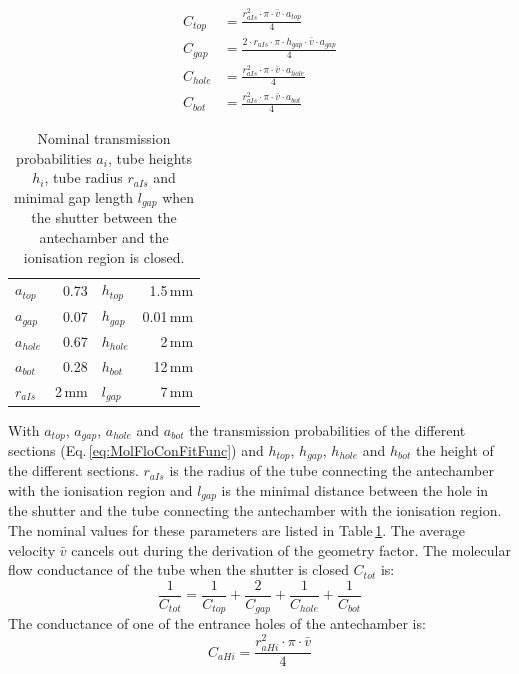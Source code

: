 	\begin{align}
		C_{top}  &= \frac{r_{aIs}^2\cdot\pi\cdot\bar{v}\cdot a_{top}}{4}\\
		C_{gap}  &= \frac{2\cdot r_{aIs}\cdot \pi \cdot h_{gap}\cdot\bar{v}\cdot a_{gap}}{4}\\
		C_{hole} &= \frac{r_{aIs}^2\cdot\pi\cdot\bar{v}\cdot a_{hole}}{4}\\
		C_{bot}  &= \frac{r_{aIs}^2\cdot\pi\cdot\bar{v}\cdot a_{bot}}{4}
	\end{align}
	\begin{table}[h]
		\begin{center}
			\begin{tabular}{l r| l r }
				$a_{top}$	& 0.73 	& $h_{top}$		& 1.5\,mm	\\
				$a_{gap}$	& 0.07 	& $h_{gap}$		& 0.01\,mm \\
				$a_{hole}$ 	& 0.67 	& $h_{hole}$ 	& 2\,mm\\
				$a_{bot}$ 	& 0.28 	& $h_{bot}$ 	& 12\,mm\\
				$r_{aIs}$ 	& 2\,mm & $l_{gap}$ 	& 7\,mm\\
			\end{tabular}
		\end{center}
		\caption{Nominal transmission probabilities $a_i$, tube heights $h_i$, tube radius $r_{aIs}$ and minimal gap length $l_{gap}$ when the shutter between the antechamber and the ionisation region is closed.}
		\label{tab:thMolFloConMotClosPara}
	\end{table}
	With $a_{top}$, $a_{gap}$, $a_{hole}$ and $a_{bot}$ the transmission probabilities of the different sections (Eq.\,\eqref{eq:MolFloConFitFunc}) and $h_{top}$, $h_{gap}$, $h_{hole}$ and $h_{bot}$ the height of the different sections. $r_{aIs}$ is the radius of the tube connecting the antechamber with the ionisation region and $l_{gap}$ is the minimal distance between the hole in the shutter and the tube connecting the antechamber with the ionisation region. The nominal values for these parameters are listed in Table\,\ref{tab:thMolFloConMotClosPara}. The average velocity $\bar{v}$ cancels out during the derivation of the geometry factor. The molecular flow conductance of the tube when the shutter is closed $C_{tot}$ is:
	\begin{equation}
		\frac{1}{C_{tot}} = \frac{1}{C_{top}} + \frac{2}{C_{gap}} + \frac{1}{C_{hole}} + \frac{1}{C_{bot}}
	\end{equation}
	The conductance of one of the entrance holes of the antechamber is:
	\begin{equation}
		C_{aHi} = \frac{r_{aHi}^2\cdot\pi\cdot\bar{v}}{4}
	\end{equation}
